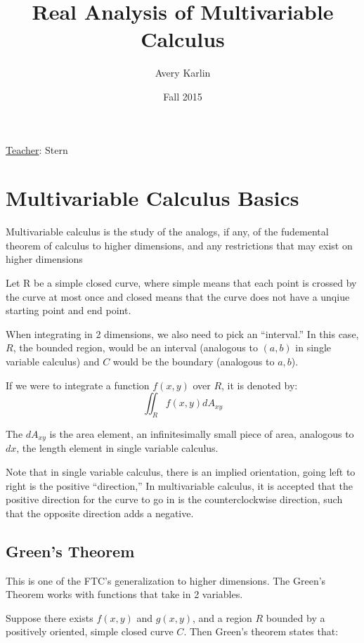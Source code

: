 \documentclass[11 pt, twoside]{article}
\begin{document}
\title{Real Analysis of Multivariable Calculus} 
\author{Avery Karlin}
\date{Fall 2015}

\maketitle
\newpage
\hypertarget{content}{\tableofcontents}
\vspace{11pt}
\noindent
\underline{Teacher}: Stern
\newpage

\section{Multivariable Calculus Basics}

Multivariable calculus is the study of the analogs, if any, of the fudemental theorem of calculus to higher dimensions, and any restrictions that may exist on higher dimensions

Let R be a simple closed curve, where simple means that each point is crossed by the curve at most once and closed means that the curve does not have a unqiue starting point and
end point.

When integrating in 2 dimensions, we also need to pick an ``interval.'' In this
case, $R$, the bounded region, would be an interval (analogous to $(a,b)$ in
single variable calculus) and $C$ would be the boundary (analogous to $a, b$).

If we were to integrate a function $f(x,y)$ over $R$, it is denoted by:
$$\iint_R f(x,y) dA_{xy}$$

The $dA_{xy}$ is the area element, an infinitesimally small piece of area,  analogous to $dx$, the length element in single variable calculus.

Note that in single variable calculus, there is an implied orientation, going
left to right is the positive ``direction,'' In multivariable calculus, it is
accepted that the positive direction for the curve to go in is the counterclockwise direction, such that the opposite direction adds a negative.

\subsection{Green's Theorem}

This is one of the FTC's generalization to higher dimensions. The Green's
Theorem works with functions that take in 2 variables.

Suppose there exists $f(x, y)$ and $g(x, y)$, and a region $R$ bounded by a
positively oriented, simple closed curve $C$. Then Green's theorem states that:
\end{document}
